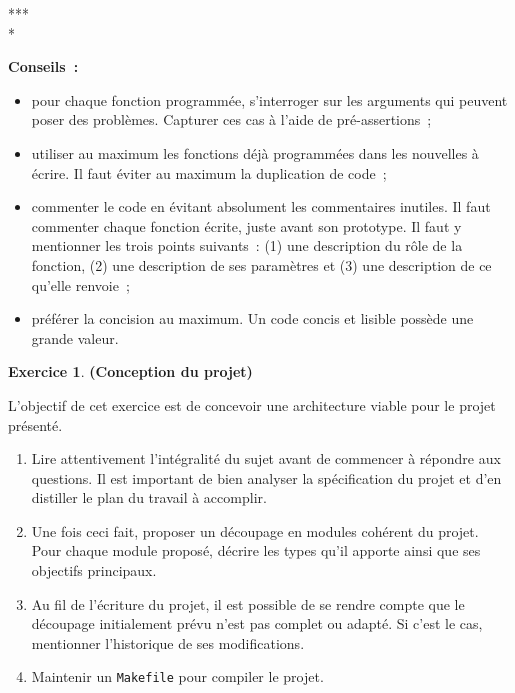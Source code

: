 \documentclass[12pt]{article}
\theoremstyle{definition}
\newtheorem{Exercice}{Exercice}
\begin{document}
\begin{center} *** \\ * \end{center}
\bigskip

{\bf Conseils~:}
\begin{itemize}
    \item pour chaque fonction programmée, s'interroger sur les arguments
    qui peuvent poser des problèmes. Capturer ces cas à l'aide de
    pré-assertions~;
    \item utiliser au maximum les fonctions déjà programmées dans les
    nouvelles à écrire. Il faut éviter au maximum la duplication de code~;
    \item commenter le code en évitant absolument les commentaires inutiles.
    Il faut commenter chaque fonction écrite, juste avant son prototype.
    Il faut y mentionner les trois points suivants~: (1) une description
    du rôle de la fonction, (2) une description de ses paramètres et (3)
    une description de ce qu'elle renvoie~;
    \item préférer la concision au maximum. Un code concis et lisible
    possède une grande valeur.
\end{itemize}
\bigskip
\bigskip

\begin{Exercice} {\bf (Conception du projet)}\smallskip

L'objectif de cet exercice est de concevoir une architecture viable pour
le projet présenté.
\begin{enumerate}
    \item Lire attentivement l'intégralité du sujet avant de commencer
    à répondre aux questions. Il est important de bien analyser la 
    spécification du projet et d'en distiller le plan du travail à 
    accomplir.
    \smallskip
    
    \item Une fois ceci fait, proposer un découpage en modules cohérent 
    du projet. Pour chaque module proposé, décrire les types qu'il apporte 
    ainsi que ses objectifs principaux.
    \smallskip
    
    \item Au fil de l'écriture du projet, il est possible de se rendre 
    compte que le 
    découpage initialement prévu n'est pas complet ou adapté. Si c'est 
    le cas, mentionner l'historique de ses modifications.
    \smallskip
    
    \item Maintenir un {\tt Makefile} pour compiler le projet.
\end{enumerate}
\end{Exercice}
\bigskip
\end{document}
